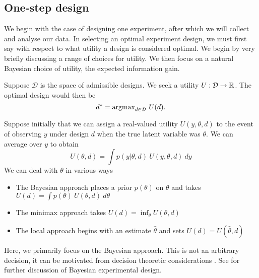 \subsection{One-step design}
We begin with the case of designing one experiment, after which we will collect and analyse our data. In selecting an optimal experiment design, we must first say with respect to what utility a design is considered optimal. We begin by very briefly discussing a range of choices for utility. We then focus on a natural Bayesian choice of utility, the expected information gain.

Suppose $\mathcal{D}$ is the space of admissible designs. We seek a utility $U: \mathcal{D} \to \mathbb{R}$. The optimal design would then be
\begin{equation}
	d^* = \text{argmax}_{d \in \mathcal{D}} \ U(d).
\end{equation}

Suppose initially that we can assign a real-valued utility $U(y, \theta, d)$ to the event of observing $y$ under design $d$ when the true latent variable was $\theta$. We can average over $y$ to obtain
\begin{equation}
	U(\theta, d) = \int p(y | \theta, d)\ U(y, \theta, d)\ dy
\end{equation}
We can deal with $\theta$ in various ways
\begin{itemize}
	\item The Bayesian approach \cite{chaloner1995} places a prior $p(\theta)$ on $\theta$ and takes \\ $U(d) = \int p(\theta)\ U(\theta, d)\ d\theta$
	\item The minimax approach \cite{fedorov1972} takes $U(d) = \inf_\theta U(\theta, d)$
	\item The local approach \cite{pronzato2010} begins with an estimate $\hat{\theta}$ and sets $U(d) = U(\hat{\theta}, d)$
\end{itemize}
Here, we primarily focus on the Bayesian approach. This is not an arbitrary decision, it can be motivated from decision theoretic considerations \cite{lindley1972}. See \cite{chaloner1995} for further discussion of Bayesian experimental design.

